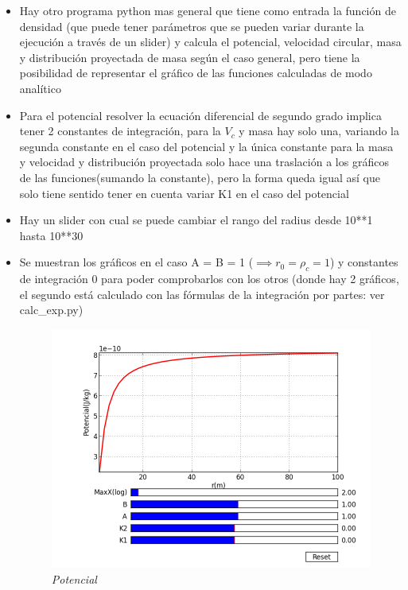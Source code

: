 \documentclass[12pt]{book}
\begin{document}
\begin{itemize}
	\item Hay otro programa python mas general que tiene como entrada la función de densidad (que puede tener parámetros que se pueden variar durante la ejecución a través de un slider) y calcula el potencial, velocidad circular, masa y distribución proyectada de masa según el caso general, pero tiene la posibilidad de representar el gráfico de las funciones calculadas de modo analítico
\item Para el potencial resolver la ecuación diferencial de segundo grado implica tener 2 constantes de integración, para la $V_c$ y masa hay solo una, variando la segunda constante en el caso del potencial y la única constante para la masa y velocidad y distribución proyectada solo hace una traslación a los gráficos de las funciones(sumando la constante), pero la forma queda igual así que solo tiene sentido tener en cuenta variar K1 en el caso del potencial 
\item Hay un slider con cual se puede cambiar el rango del radius desde 10**1 hasta 10**30
\item Se muestran los gráficos en el caso A = B = 1 ($\implies r_0= \rho_c =1$) y constantes de integración 0 para poder comprobarlos con los otros (donde hay 2 gráficos, el segundo está calculado con las fórmulas de la integración por partes: ver calc\_exp.py)

\begin{figure}[!ht]
 \centering
 \includegraphics[scale=0.33]{pt_pot_A1_B1.png}
 \caption{\emph{Potencial}}
\end{figure}


\end{itemize}
\end{document}
